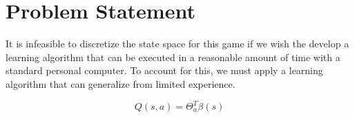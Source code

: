 \section{Problem Statement}

It is infeasible to discretize the state space for this game if we wish the develop a learning algorithm that can be executed in a reasonable amount of time with a standard personal computer. To account for this, we must apply a learning algorithm that can generalize from limited experience. 

\begin{equation}
	Q(s,a) = \Theta_{a}^{T}\beta(s)
\end{equation}